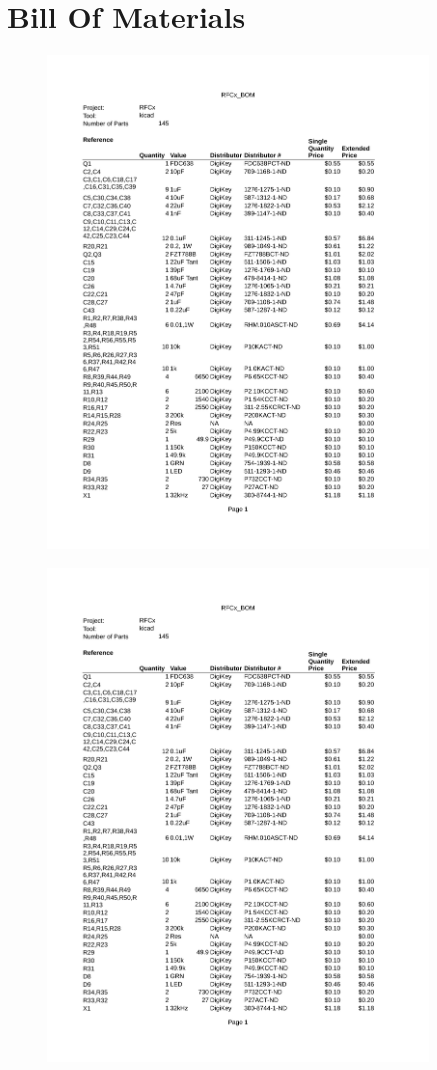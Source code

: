\documentclass{article}
\numberwithin{figure}{section}
\numberwithin{equation}{section}
\begin{document}
{\newpage
\section{Bill Of Materials} \label{sect:appendixB}
\begin{figure}[H]
	\centering
	\includegraphics[page=1,width=0.9\textwidth]{RFCx_BOM.pdf}
	\caption{}
	\label{fig:bom1}
\end{figure}
\begin{figure}[H]
	\centering
	\includegraphics[page=2,width=0.9\textwidth]{RFCx_BOM.pdf}

\end{figure}}
\end{document}

